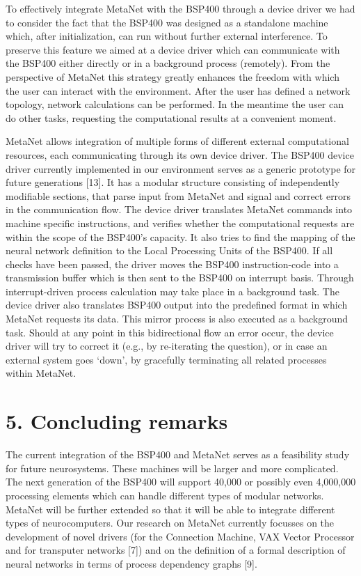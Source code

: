 \documentclass[11pt, a4paper]{article}
\begin{document}
To effectively integrate MetaNet with the BSP400 through a device driver we had to consider the fact that the BSP400 was designed as a standalone machine which, after initialization, can run without further external interference. To preserve this feature we aimed at a device driver which can communicate with the BSP400 either directly or in a background process (remotely). From the perspective of MetaNet this strategy greatly enhances the freedom with which the user can interact with the environment. After the user has defined a network topology, network calculations can be performed. In the meantime the user can do other tasks, requesting the computational results at a convenient moment.

MetaNet allows integration of multiple forms of different external computational resources, each communicating through its own device driver. The BSP400 device driver currently implemented in our environment serves as a generic prototype for future generations [13]. It has a modular structure consisting of independently modifiable sections, that parse input from MetaNet and signal and correct errors in the communication flow. The device driver translates MetaNet commands into machine specific instructions, and verifies whether the computational requests are within the scope of the BSP400's capacity. It also tries to find the mapping of the neural network definition to the Local Processing Units of the BSP400. If all checks have been passed, the driver moves the BSP400 instruction-code into a transmission buffer which is then sent to the BSP400 on interrupt basis. Through interrupt-driven process calculation may take place in a background task. The device driver also translates BSP400 output into the predefined format in which MetaNet requests its data. This mirror process is also executed as a background task. Should at any point in this bidirectional flow an error occur, the device driver will try to correct it (e.g., by re-iterating the question), or in case an external system goes `down', by gracefully terminating all related processes within MetaNet.

\section*{\color{navyaccent} 5. Concluding remarks}

The current integration of the BSP400 and MetaNet serves as a feasibility study for future neurosystems. These machines will be larger and more complicated. The next generation of the BSP400 will support 40,000 or possibly even 4,000,000 processing elements which can handle different types of modular networks. MetaNet will be further extended so that it will be able to integrate different types of neurocomputers. Our research on MetaNet currently focusses on the development of novel drivers (for the Connection Machine, VAX Vector Processor and for transputer networks [7]) and on the definition of a formal description of neural networks in terms of process dependency graphs [9].
\end{document}
